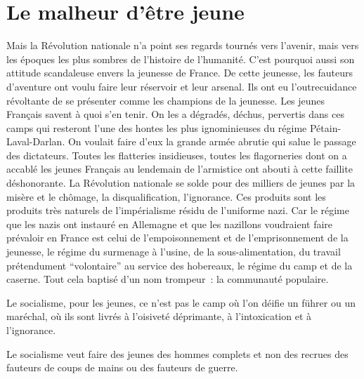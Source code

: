 \documentclass[french,twoside]{book} %
\begin{document}
\section[{Le malheur d’être jeune}]{Le malheur d’être jeune}
\noindent Mais la Révolution nationale n’a point ses regards tournés vers l’avenir, mais vers les époques les plus sombres de l’histoire de l’humanité. C’est pourquoi aussi son attitude scandaleuse envers la jeunesse de France. De cette jeunesse, les fauteurs d’aventure ont voulu faire leur réservoir et leur arsenal. Ils ont eu l’outrecuidance révoltante de se présenter comme les champions de la jeunesse. Les jeunes Français savent à quoi s’en tenir. On les a dégradés, déchus, pervertis dans ces camps qui resteront l’une des hontes les plus ignominieuses du régime Pétain-Laval-Darlan. On voulait faire d’eux la grande armée abrutie qui salue le passage des dictateurs. Toutes les flatteries insidieuses, toutes les flagorneries dont on a accablé les jeunes Français au lendemain de l’armistice ont abouti à cette faillite déshonorante. La Révolution nationale se solde pour des milliers de jeunes par la misère et le chômage, la disqualification, l’ignorance. Ces produits sont les produits très naturels de l’impérialisme résidu de l’uniforme nazi. Car le régime que les nazis ont instauré en Allemagne et que les nazillons voudraient faire prévaloir en France est celui de l’empoisonnement et de l’emprisonnement de la jeunesse, le régime du surmenage à l’usine, de la sous-alimentation, du travail prétendument “volontaire” au service des hobereaux, le régime du camp   et de la caserne. Tout cela baptisé d’un nom trompeur : la communauté populaire.\par
Le socialisme, pour les jeunes, ce n’est pas le camp où l’on déifie un führer ou un maréchal, où ils sont livrés à l’oisiveté déprimante, à l’intoxication et à l’ignorance.\par
Le socialisme veut faire des jeunes des hommes complets et non des recrues des fauteurs de coups de mains ou des fauteurs de guerre.
\end{document}
